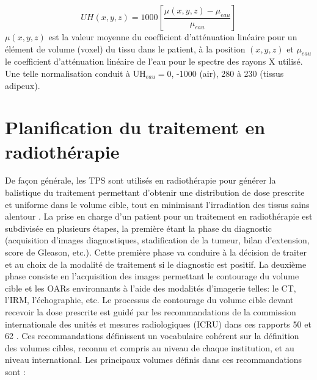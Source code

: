 %
\begin{equation}\label{eqn:Hounsfield}
	UH\left(x, y, z\right)= 1000 \left[\frac{\mu\left(x,y,z\right)-\mu_{eau}}{\mu_{eau}}\right]
\end{equation}
% 
$\mu\left(x,y,z\right)$ est la valeur moyenne du coefficient d’atténuation linéaire pour un élément de volume (voxel) du tissu dans le patient, à la position $(x, y, z)$ et $\mu_{eau}$ le coefficient d'atténuation linéaire de l'eau pour le spectre des rayons X utilisé. Une telle normalisation conduit à UH$_{eau}=0$, -1000 (air), 280 à 230 (tissus adipeux).
%
\section{Planification du traitement en radiothérapie}
De façon générale, les TPS sont utilisés en radiothérapie pour générer la balistique du traitement permettant d’obtenir une distribution de dose prescrite et uniforme dans le volume cible, tout en minimisant l’irradiation des tissus sains alentour \cite{Thomadsen1, Venselaar, Gerbaule}. La prise en charge d’un patient pour un traitement en radiothérapie est subdivisée en plusieurs étapes, la première étant la phase du diagnostic (acquisition d’images diagnostiques, stadification de la tumeur, bilan d’extension, score de Gleason, etc.). Cette première phase va conduire à la décision de traiter et au choix de la modalité de traitement si le diagnostic est positif. La deuxième phase consiste en l’acquisition des images permettant le contourage du volume cible et les OARs environnants à l’aide des modalités d’imagerie telles: le CT, l’IRM, l’échographie, etc. Le processus de contourage du volume cible devant recevoir la dose prescrite est guidé par les recommandations de la commission internationale des unités et mesures radiologiques (ICRU) dans ces rapports 50 et 62  \cite{ICRU50, ICRU62}. Ces recommandations définissent un vocabulaire cohérent sur la définition des volumes cibles, reconnu et compris au niveau de chaque institution, et au niveau international. Les principaux volumes définis dans ces recommandations sont :
%
